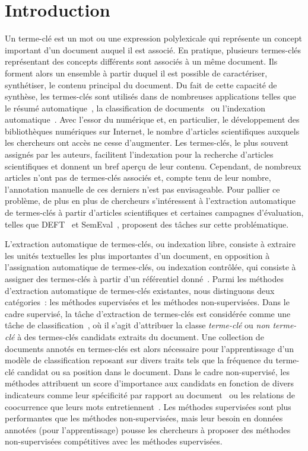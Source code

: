 \section{Introduction}
\label{sec:introduction}
  Un terme-clé est un mot ou une expression polylexicale qui représente un
  concept important d'un document auquel il est associé. En pratique, plusieurs
  termes-clés représentant des concepts différents sont associés à un même
  document. Ils forment alors un ensemble à partir duquel il est
  possible de caractériser, synthétiser, le contenu principal du document. Du
  fait de cette capacité de synthèse, les termes-clés sont utilisés dans de
  nombreuses applications telles que le résumé
  automatique~\cite{avanzo2005keyphrase}, la classification de
  documents~\cite{han2007webdocumentclustering} ou l'indexation
  automatique~\cite{medelyan2008smalltrainingset}. Avec l'essor du numérique et,
  en particulier, le développement des bibliothèques numériques sur Internet, le
  nombre d'articles scientifiques auxquels les chercheurs ont accès ne cesse
  d'augmenter. Les termes-clés, le plus souvent assignés par les auteurs,
  facilitent l'indexation pour la recherche d'articles scientifiques et donnent
  un bref aperçu de leur contenu. Cependant, de nombreux articles n'ont pas de
  termes-clés associés et, compte tenu de leur nombre, l'annotation manuelle de
  ces derniers n'est pas envisageable. Pour pallier ce problème, de plus en plus
  de chercheurs s'intéressent à l'extraction automatique de termes-clés à partir
  d'articles scientifiques et certaines campagnes d'évaluation, telles que
  DEFT~\cite{paroubek2012deft} et SemEval~\cite{kim2010semeval}, proposent des
  tâches sur cette problématique.

  L'extraction automatique de termes-clés, ou indexation libre,
  consiste à extraire les unités textuelles les plus importantes d'un document,
  en opposition à l'assignation automatique de termes-clés, ou
  indexation contrôlée, qui consiste à assigner des termes-clés à partir d'un
  référentiel donné~\cite{paroubek2012deft}. Parmi les méthodes d'extraction
  automatique de termes-clés existantes, nous distinguons deux catégories~: les
  méthodes supervisées et les méthodes non-supervisées. Dans le cadre supervisé,
  la tâche d'extraction de termes-clés est considérée comme une tâche de
  classification~\cite{witten1999kea}, où il s'agit d'attribuer la classe
  \og{}\textit{terme-clé}\fg{} ou \og{}\textit{non terme-clé}\fg{} à des
  termes-clés candidats extraits du document. Une collection de documents
  annotés en termes-clés est alors nécessaire pour l'apprentissage d'un modèle
  de classification reposant sur divers traits tels que la fréquence du
  terme-clé candidat ou sa position dans le document. Dans le cadre
  non-supervisé, les méthodes attribuent un score d'importance aux candidats
  en fonction de divers indicateurs comme leur spécificité par rapport au
  document~\cite{paukkeri2010likey} ou les relations de coocurrence que leurs
  mots entretiennent~\cite{mihalcea2004textrank}. Les méthodes supervisées sont
  plus performantes que les méthodes non-supervisées, mais leur besoin en
  données annotées (pour l'apprentissage) pousse les chercheurs à proposer des
  méthodes non-supervisées compétitives avec les méthodes supervisées.

